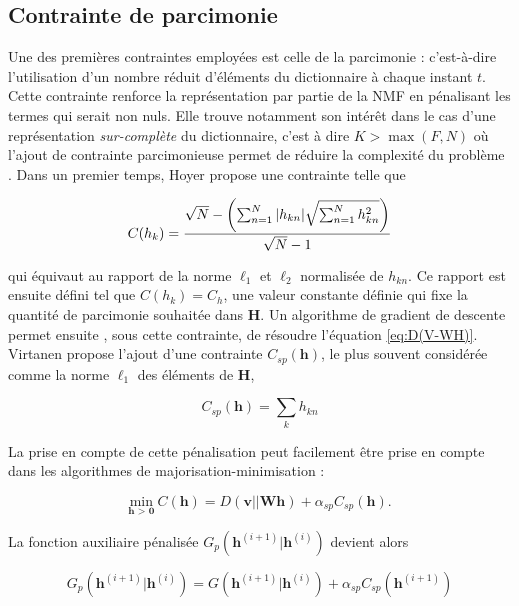 \subsection{Contrainte de parcimonie}
Une des premières contraintes employées est celle de la parcimonie \cite{hoyer_non-negative_2004, le2015sparse} : c'est-à-dire l'utilisation d'un nombre réduit d'éléments du dictionnaire à chaque instant $t$. Cette contrainte renforce la représentation par partie de la NMF en pénalisant les termes qui serait non nuls. Elle trouve notamment son intérêt dans le cas d'une représentation \textit{sur-complète} du dictionnaire, c'est à dire $K > \max(F,N)$ où l'ajout de contrainte parcimonieuse permet de réduire la complexité du problème \cite{eggert2004sparse}. Dans un premier temps, Hoyer \cite{hoyer_non-negative_2004} propose une contrainte telle que

\begin{equation}
C(h_k) = \frac{\sqrt{N}-\left( \sum_{n=1}^N \vert h_{kn} \vert \/ \sqrt{\sum_{n = 1}^N h_{kn}^2} \right)}{\sqrt{N}-1}
\end{equation}

qui équivaut au rapport de la norme $\ell_1$ et $\ell_2$ normalisée de $h_{kn}$. Ce rapport est ensuite défini tel que $C(h_k) = C_h$, une valeur constante définie qui fixe la quantité de parcimonie souhaitée dans $\mathbf{H}$. Un algorithme de gradient de descente permet ensuite , sous cette contrainte, de résoudre l'équation \ref{eq:D(V-WH)}. Virtanen \cite{virtanen_monaural_2007} propose l'ajout d'une contrainte $C_{sp}(\mathbf{h})$, le plus souvent considérée comme la norme $\ell_1$ des éléments de $\mathbf{H}$,

\begin{equation}
C_{sp}(\mathbf{h}) = \sum_k h_{kn}
\end{equation}

La prise en compte de cette pénalisation  peut facilement être prise en compte dans les algorithmes de majorisation-minimisation :

\begin{equation}
\underset{\textbf{h > 0}}{\text{min}}~C(\mathbf{h}) = D(\mathbf{v} \vert\vert \mathbf{Wh}) + \alpha_{sp} C_{sp}(\mathbf{h}).
\end{equation}

La fonction auxiliaire pénalisée $G_p(\mathbf{h}^{(i+1)}\vert \mathbf{h}^{(i)})$ devient alors

\begin{equation}
G_p(\mathbf{h}^{(i+1)}\vert \mathbf{h}^{(i)}) = G(\mathbf{h}^{(i+1)}\vert \mathbf{h}^{(i)})+ \alpha_{sp}C_{sp}(\mathbf{h}^{(i+1)})
\end{equation}

